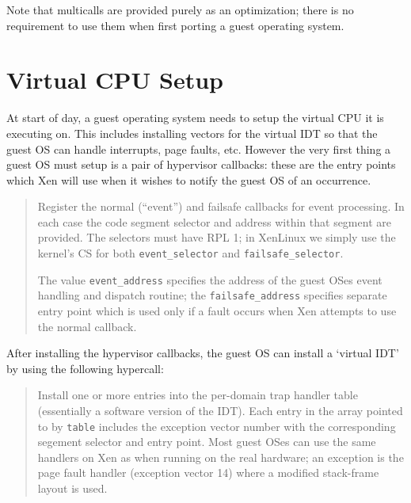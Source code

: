 \documentclass[11pt,twoside,final,openright]{xenstyle}
\begin{document}
Note that multicalls are provided purely as an optimization; there is
no requirement to use them when first porting a guest operating
system.


\section{Virtual CPU Setup} 

At start of day, a guest operating system needs to setup the virtual
CPU it is executing on. This includes installing vectors for the
virtual IDT so that the guest OS can handle interrupts, page faults,
etc. However the very first thing a guest OS must setup is a pair 
of hypervisor callbacks: these are the entry points which Xen will
use when it wishes to notify the guest OS of an occurrence. 

\begin{quote}

Register the normal (``event'') and failsafe callbacks for 
event processing. In each case the code segment selector and 
address within that segment are provided. The selectors must
have RPL 1; in XenLinux we simply use the kernel's CS for both 
{\tt event\_selector} and {\tt failsafe\_selector}.

The value {\tt event\_address} specifies the address of the guest OSes
event handling and dispatch routine; the {\tt failsafe\_address}
specifies separate entry point which is used only if a fault occurs
when Xen attempts to use the normal callback. 
\end{quote} 


After installing the hypervisor callbacks, the guest OS can 
install a `virtual IDT' by using the following hypercall: 

\begin{quote} 

Install one or more entries into the per-domain 
trap handler table (essentially a software version of the IDT). 
Each entry in the array pointed to by {\tt table} includes the 
exception vector number with the corresponding segement selector 
and entry point. Most guest OSes can use the same handlers on 
Xen as when running on the real hardware; an exception is the 
page fault handler (exception vector 14) where a modified 
stack-frame layout is used. 


\end{quote} 
\end{document}
